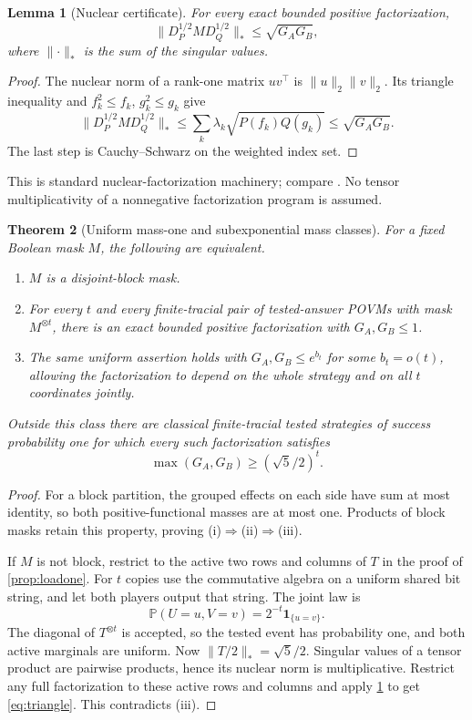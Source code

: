 \documentclass[11pt,reqno]{amsart}
\numberwithin{equation}{section}
\newtheorem{theorem}{Theorem}[section]
\newtheorem{lemma}[theorem]{Lemma}
\theoremstyle{definition}
\theoremstyle{remark}
\newcommand{\Pp}{\mathbb P}
\newcommand{\one}{\mathbf1}
\newcommand{\norm}[1]{\lVert#1\rVert}
\begin{document}
\begin{lemma}[Nuclear certificate]\label{lem:nuclear}
For every exact bounded positive factorization,
\begin{equation}\label{eq:nuclear}
 \norm{D_P^{1/2}MD_Q^{1/2}}_*
 \le\sqrt{G_AG_B},
\end{equation}
where \(\norm{\cdot}_*\) is the sum of the singular values.
\end{lemma}
\begin{proof}
The nuclear norm of a rank-one matrix \(uv^\top\) is
\(\norm u_2\norm v_2\). Its triangle inequality and \(f_k^2\le f_k\), \(g_k^2\le g_k\) give
\[
 \norm{D_P^{1/2}MD_Q^{1/2}}_*
 \le\sum_k\lambda_k\sqrt{P(f_k)Q(g_k)}
 \le\sqrt{G_AG_B}.
\]
The last step is Cauchy--Schwarz on the weighted index set.
\end{proof}
This is standard nuclear-factorization machinery; compare \cite{FP}. No tensor multiplicativity of a nonnegative factorization program is assumed.

\begin{theorem}[Uniform mass-one and subexponential mass classes]\label{thm:maxclass}
For a fixed Boolean mask \(M\), the following are equivalent.
\begin{enumerate}
\item \(M\) is a disjoint-block mask.
\item For every \(t\) and every finite-tracial pair of tested-answer POVMs with mask \(M^{\otimes t}\), there is an exact bounded positive factorization with \(G_A,G_B\le1\).
\item The same uniform assertion holds with \(G_A,G_B\le e^{b_t}\) for some \(b_t=o(t)\), allowing the factorization to depend on the whole strategy and on all \(t\) coordinates jointly.
\end{enumerate}
Outside this class there are classical finite-tracial tested strategies of success probability one for which every such factorization satisfies
\begin{equation}\label{eq:triangle}
 \max(G_A,G_B)\ge(\sqrt5/2)^t.
\end{equation}
\end{theorem}
\begin{proof}
For a block partition, the grouped effects on each side have sum at most identity, so both positive-functional masses are at most one. Products of block masks retain this property, proving (i)\(\Rightarrow\)(ii)\(\Rightarrow\)(iii).

If \(M\) is not block, restrict to the active two rows and columns of \(T\) in the proof of \cref{prop:loadone}. For \(t\) copies use the commutative algebra on a uniform shared bit string, and let both players output that string. The joint law is
\[
 \Pp(U=u,V=v)=2^{-t}\one_{\{u=v\}}.
\]
The diagonal of \(T^{\otimes t}\) is accepted, so the tested event has probability one, and both active marginals are uniform. Now
\(\norm{T/2}_*=\sqrt5/2\). Singular values of a tensor product are pairwise products, hence its nuclear norm is multiplicative. Restrict any full factorization to these active rows and columns and apply \cref{lem:nuclear} to get \eqref{eq:triangle}. This contradicts (iii).
\end{proof}
\end{document}
